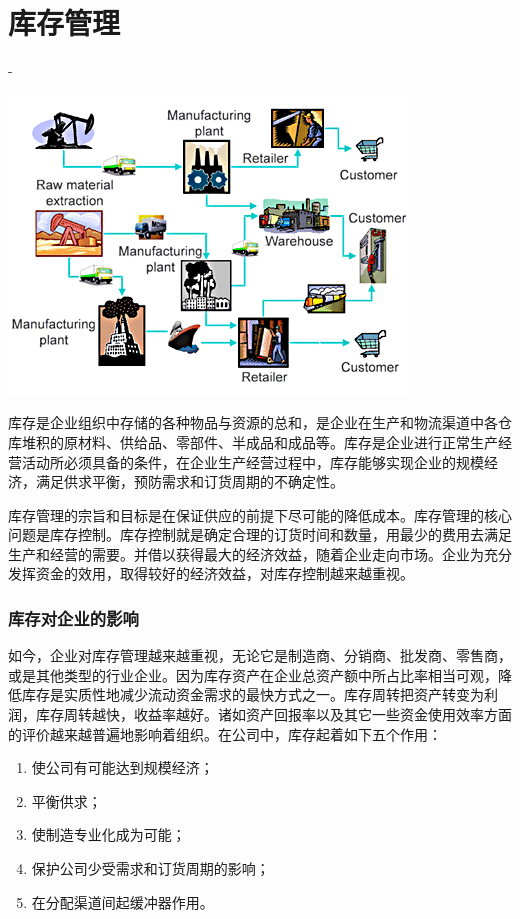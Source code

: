 \section {库存管理}

-

    \begin{center}
        \includegraphics[scale=1.5] {factory.jpg}
    \end{center}

    库存是企业组织中存储的各种物品与资源的总和，是企业在生产和物流渠道中各仓库堆积的原材料、供给品、零部件、半成品和成品等。库存是企业进行正常生产经营活动所必须具备的条件，在企业生产经营过程中，库存能够实现企业的规模经济，满足供求平衡，预防需求和订货周期的不确定性。

    库存管理的宗旨和目标是在保证供应的前提下尽可能的降低成本。库存管理的核心问题是库存控制。库存控制就是确定合理的订货时间和数量，用最少的费用去满足生产和经营的需要。并借以获得最大的经济效益，随着企业走向市场。企业为充分发挥资金的效用，取得较好的经济效益，对库存控制越来越重视。

\subsubsection { 库存对企业的影响}

    如今，企业对库存管理越来越重视，无论它是制造商、分销商、批发商、零售商，或是其他类型的行业企业。因为库存资产在企业总资产额中所占比率相当可观，降低库存是实质性地减少流动资金需求的最快方式之一。库存周转把资产转变为利润，库存周转越快，收益率越好。诸如资产回报率以及其它一些资金使用效率方面的评价越来越普遍地影响着组织。在公司中，库存起着如下五个作用：

    \begin{enumerate}
        \item  使公司有可能达到规模经济；
        \item  平衡供求；
        \item  使制造专业化成为可能；
        \item  保护公司少受需求和订货周期的影响；
        \item  在分配渠道间起缓冲器作用。
    \end{enumerate}

